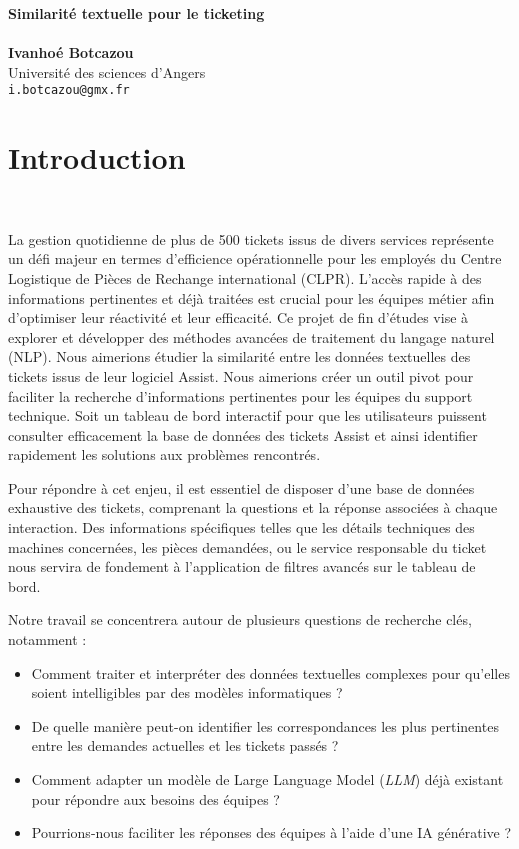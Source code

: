 \documentclass[12pt]{article}
\makeatletter
\newcommand{\titlePage}{
		\begin{center}
			\noindent\makebox[\linewidth]{\rule{\textwidth}{4pt}} 
			\Huge\textbf{\sc Similarité textuelle pour le ticketing}\\[-0.25cm]
			\noindent\makebox[\linewidth]{\rule{\textwidth}{2pt}} 
			\hfill\\[1cm]
			\vspace*{4pt}
			\large \textbf{Ivanhoé Botcazou}\\
			\large Université des sciences d'Angers \\
			\texttt{i.botcazou@gmx.fr}\\[2cm]
		\end{center}
}
\theoremstyle{definition}
\makeatother
\begin{document}
	
	\titlePage %
	\tableofcontents
	\newpage 
	\section{Introduction}\quad\\[-0.5cm]
	
	 \par La gestion quotidienne de plus de 500 tickets issus de divers services représente un défi majeur en termes d'efficience opérationnelle pour les employés du Centre Logistique de Pièces de Rechange international (CLPR). L'accès rapide à des informations pertinentes et déjà traitées est crucial pour les équipes métier afin d'optimiser leur réactivité et leur efficacité. Ce projet de fin d'études vise à explorer et développer des méthodes avancées de traitement du langage naturel (NLP). Nous aimerions étudier la similarité entre les données textuelles des tickets issus de leur logiciel Assist. Nous aimerions créer un outil pivot pour faciliter la recherche d'informations pertinentes pour les équipes du support technique. Soit un tableau de bord interactif pour que les utilisateurs puissent consulter efficacement la base de données des tickets Assist et ainsi identifier rapidement les solutions aux problèmes rencontrés.
	
	Pour répondre à cet enjeu, il est essentiel de disposer d'une base de données exhaustive des tickets, comprenant la questions et la réponse associées à chaque interaction. Des informations spécifiques telles que les détails techniques des machines concernées, les pièces demandées, ou le service responsable du ticket nous servira de fondement à l'application de filtres avancés sur le tableau de bord.
	
	Notre travail se concentrera autour de plusieurs questions de recherche clés, notamment : 
		\begin{itemize}[-]
		\item Comment traiter et interpréter des données textuelles complexes pour qu'elles soient intelligibles par des modèles informatiques ? 
		\item De quelle manière peut-on identifier les correspondances les plus pertinentes entre les demandes actuelles et les tickets passés ? 
		\item Comment adapter un modèle de Large Language Model (\emph{LLM}) déjà existant pour répondre aux besoins des équipes ? 
		\item Pourrions-nous faciliter les réponses des équipes à l'aide d'une IA générative ? \\
	\end{itemize}
	
\end{document}
